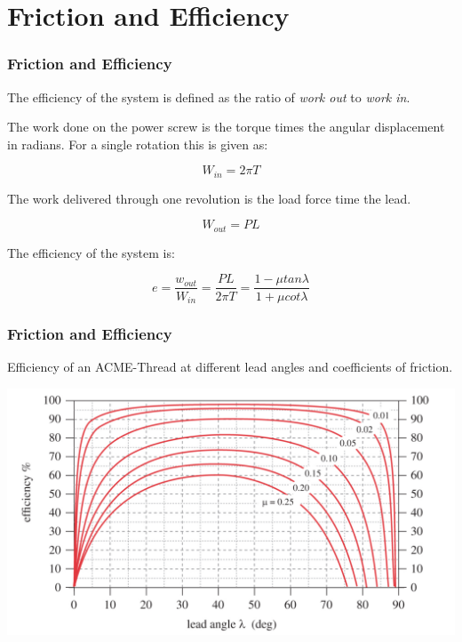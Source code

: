 \documentclass[fleqn]{beamer} %
\newcommand{\sectiontitleIV}{Friction and Efficiency}
\begin{document}
	
\section{\sectiontitleIV}	

    \begin{frame}[label=sectionIV] \small
		\frametitle{\sectiontitleIV}    

		The efficiency of the system is defined as the ratio of {\it work out} to {\it work in}. 

		The work done on the power screw is the torque times the angular displacement in radians. For a single rotation this is given as: 

		\[W_{in}=2\pi T\]

		The work delivered through one revolution is the load force time the lead.

		\[W_{out}=PL\]

		The efficiency of the system is:

		\[e=\frac{w_{out}}{W_{in}}=\frac{PL}{2\pi T} = \frac{1-\mu tan\lambda}{1+\mu cot\lambda}\]

	\end{frame}


    \begin{frame}[label=sectionIV] \small
		\frametitle{\sectiontitleIV}  	

		Efficiency of an ACME-Thread at different lead angles and coefficients of friction.

		\includegraphics[scale=.2]{images/figure_15_8.png}



	\end{frame}



		
\end{document}
